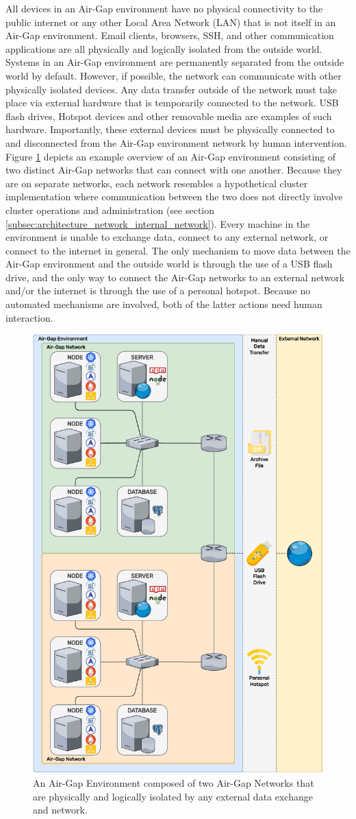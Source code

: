 All devices in an Air-Gap environment have no physical connectivity to the public
internet or any other Local Area Network (LAN) that is not itself in an Air-Gap environment.
Email clients, browsers, SSH, and other communication applications are all physically
and logically isolated from the outside world. \\ %
Systems in an Air-Gap environment are permanently separated from the outside world
by default. However, if possible, the network can communicate with other
physically isolated devices. Any data transfer outside of the network must take place
via external hardware that is temporarily connected to the network. USB flash
drives, Hotspot devices and other removable media are examples of such hardware.
Importantly, these external devices must be physically connected to and disconnected
from the Air-Gap environment network by human intervention. \\ %
Figure \ref{fig:airgap} depicts an example overview of an Air-Gap environment consisting
of two distinct Air-Gap networks that can connect with one another. Because they
are on separate networks, each network resembles a hypothetical cluster implementation
where communication between the two does not directly involve cluster operations
and administration (see section
\ref{subsec:architecture_network_internal_network}). Every machine in the
environment is unable to exchange data, connect to any external network, or
connect to the internet in general. The only mechanism to move data between the Air-Gap
environment and the outside world is through the use of a USB flash drive, and
the only way to connect the Air-Gap networks to an external network and/or the
internet is through the use of a personal hotspot. Because no automated mechanisms
are involved, both of the latter actions need human interaction.

\begin{figure}
  \centering
  \includegraphics[width=.5\textwidth]{images/implementation/airgap.pdf}
  \caption{An
  Air-Gap
  Environment
  composed
  of
  two
  Air-Gap
  Networks
  that
  are
  physically
  and
  logically
  isolated
  by
  any
  external
  data
  exchange
  and
  network.}
  \label{fig:airgap}
\end{figure}

